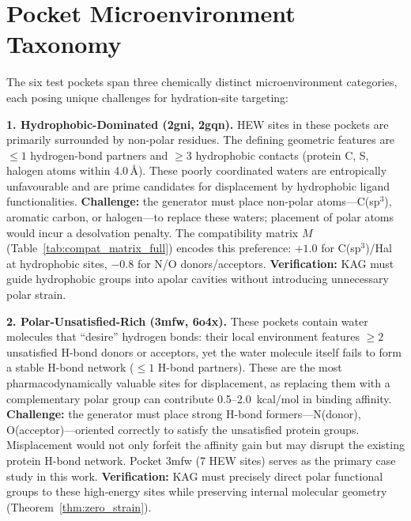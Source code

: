 \documentclass{article}
\begin{document}
\section{Pocket Microenvironment Taxonomy}
\label{app:pocket_taxonomy}

The six test pockets span three chemically distinct microenvironment
categories, each posing unique challenges for hydration-site targeting:

\vspace{4pt}
\noindent\textbf{1. Hydrophobic-Dominated (2gni, 2gqn).}
HEW sites in these pockets are primarily surrounded by non-polar residues.
The defining geometric features are $\le 1$ hydrogen-bond partners and
$\ge 3$ hydrophobic contacts (protein C, S, halogen atoms within
4.0\,\AA).  These poorly coordinated waters are entropically unfavourable
and are prime candidates for displacement by hydrophobic ligand
functionalities.  \textbf{Challenge:} the generator must place non-polar
atoms---C(sp$^3$), aromatic carbon, or halogen---to replace these waters;
placement of polar atoms would incur a desolvation penalty.  The
compatibility matrix $M$ (Table~\ref{tab:compat_matrix_full}) encodes this
preference: $+1.0$ for C(sp$^3$)/Hal at hydrophobic sites, $-0.8$ for
N/O donors/acceptors.  \textbf{Verification:} KAG must guide hydrophobic
groups into apolar cavities without introducing unnecessary polar strain.

\vspace{4pt}
\noindent\textbf{2. Polar-Unsatisfied-Rich (3mfw, 6o4x).}
These pockets contain water molecules that ``desire'' hydrogen bonds:
their local environment features $\ge 2$ unsatisfied H-bond donors or
acceptors, yet the water molecule itself fails to form a stable H-bond
network ($\le 1$ H-bond partners).  These are the most pharmacodynamically
valuable sites for displacement, as replacing them with a complementary
polar group can contribute 0.5--2.0~kcal/mol in binding affinity.
\textbf{Challenge:} the generator must place strong H-bond formers---N(donor),
O(acceptor)---oriented correctly to satisfy the unsatisfied protein groups.
Misplacement would not only forfeit the affinity gain but may disrupt the
existing protein H-bond network.  Pocket 3mfw (7 HEW sites) serves as the
primary case study in this work.  \textbf{Verification:} KAG must precisely
direct polar functional groups to these high-energy sites while preserving
internal molecular geometry (Theorem~\ref{thm:zero_strain}).
\end{document}

